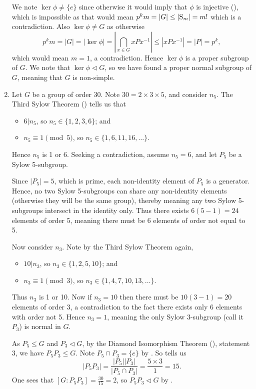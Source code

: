 \begin{enumerate}
    We note $\ker\phi \neq \{e\}$ since otherwise it would imply that $\phi$ is injective (), which is impossible as that would mean $p^km = |G| \leq |\mathrm{S}_{m}| = m!$ which is a contradiction. Also $\ker\phi \neq G$ as otherwise
    \[
        p^km = |G| = |\ker\phi| = \left|\bigcap_{x \in G} xPx^{-1}\right| \leq |xPx^{-1}| = |P| = p^k,
    \]
    which would mean $m = 1$, a contradiction. Hence $\ker\phi$ is a proper subgroup of $G$. We note that $\ker\phi \lhd G$, so we have found a proper normal subgroup of $G$, meaning that $G$ is non-simple.

    \item Let $G$ be a group of order 30. Note $30 = 2 \times 3 \times 5$, and consider $n_5$. The Third Sylow Theorem () tells us that
    \begin{itemize}
        \item $6 \vert n_5$, so $n_5 \in \{1, 2, 3, 6\}$; and
        \item $n_5 \equiv 1 \pmod 5$, so $n_5 \in \{1, 6, 11, 16, \dots\}$.
    \end{itemize}
    Hence $n_5$ is 1 or 6. Seeking a contradiction, assume $n_5 = 6$, and let $P_5$ be a Sylow 5-subgroup.

    Since $|P_5| = 5$, which is prime, each non-identity element of $P_5$ is a generator. Hence, no two Sylow 5-subgroups can share any non-identity elements (otherwise they will be the same group), thereby meaning any two Sylow 5-subgroups intersect in the identity only. Thus there exists $6(5-1) = 24$ elements of order 5, meaning there must be 6 elements of order not equal to 5.

    Now consider $n_3$. Note by the Third Sylow Theorem again,
    \begin{itemize}
        \item $10 \vert n_3$, so $n_3 \in \{1, 2, 5, 10\}$; and
        \item $n_3 \equiv 1 \pmod 3$, so $n_3 \in \{1, 4, 7, 10, 13, \dots\}$.
    \end{itemize}
    Thus $n_3$ is 1 or 10. Now if $n_3 = 10$ then there must be $10(3-1) = 20$ elements of order 3, a contradiction to the fact there exists only 6 elements with order not 5. Hence $n_3 = 1$, meaning the only Sylow 3-subgroup (call it $P_3$) is normal in $G$.

    As $P_5 \leq G$ and $P_3 \lhd G$, by the Diamond Isomorphism Theorem (), statement 3, we have $P_5P_3 \leq G$. Note $P_5 \cap P_3 = \{e\}$ by . So  tells us
    \[
        |P_5P_3| = \frac{|P_5||P_3|}{|P_5 \cap P_3|} = \frac{5\times3}{1} = 15.
    \]
    One sees that $[G:P_5P_3] = \frac{30}{15} = 2$, so $P_5P_3 \lhd G$ by .


\end{enumerate}
